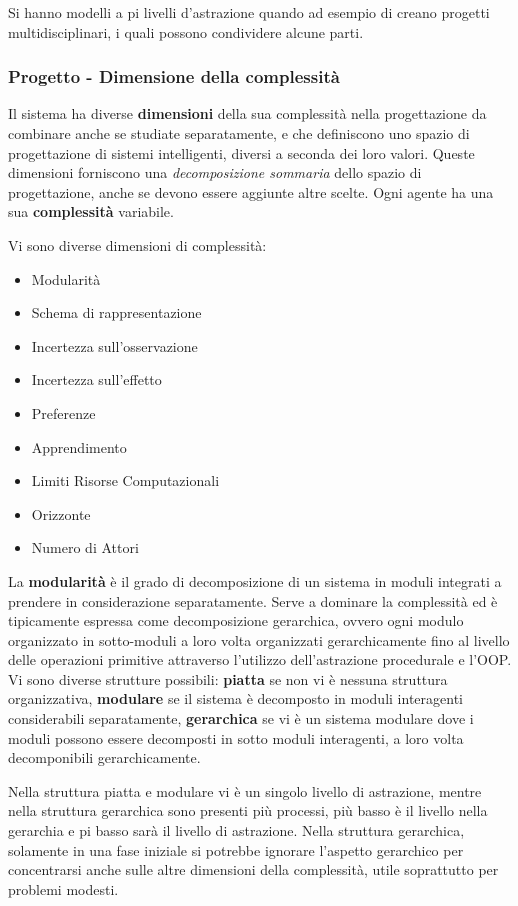 \documentclass[a4paper]{extarticle}
\begin{document}
Si hanno modelli a pi livelli d'astrazione quando ad esempio di creano progetti multidisciplinari, i quali possono condividere alcune parti.

\subsubsection{Progetto - Dimensione della complessità}

Il sistema ha diverse \textbf{dimensioni} della sua complessità nella progettazione da combinare anche se studiate separatamente, e che definiscono uno spazio di progettazione di sistemi intelligenti, diversi a seconda dei loro valori. Queste dimensioni forniscono una \textit{decomposizione sommaria} dello spazio di progettazione, anche se devono essere aggiunte altre scelte. Ogni agente ha una sua \textbf{complessità} variabile.

Vi sono diverse dimensioni di complessità:
\begin{itemize}
\item Modularità
\item Schema di rappresentazione
\item Incertezza sull'osservazione
\item Incertezza sull'effetto
\item Preferenze
\item Apprendimento
\item Limiti Risorse Computazionali
\item Orizzonte
\item Numero di Attori
\end{itemize}

La \textbf{modularità} è il grado di decomposizione di un sistema in moduli integrati a prendere in considerazione separatamente. Serve a dominare la complessità ed è tipicamente espressa come decomposizione gerarchica, ovvero ogni modulo organizzato in sotto-moduli a loro volta organizzati gerarchicamente fino al livello delle operazioni primitive attraverso l'utilizzo dell'astrazione procedurale e l'OOP. Vi sono diverse strutture possibili: \textbf{piatta} se non vi è nessuna struttura organizzativa, \textbf{modulare} se il sistema è decomposto in moduli interagenti considerabili separatamente, \textbf{gerarchica} se vi è un sistema modulare dove i moduli possono essere decomposti in sotto moduli interagenti, a loro volta decomponibili gerarchicamente.

Nella struttura piatta e modulare vi è un singolo livello di astrazione, mentre nella struttura gerarchica sono presenti più processi, più basso è il livello nella gerarchia e pi basso sarà il livello di astrazione. Nella struttura gerarchica, solamente in una fase iniziale si potrebbe ignorare l'aspetto gerarchico per concentrarsi anche sulle altre dimensioni della complessità, utile soprattutto per problemi modesti.
\end{document}
